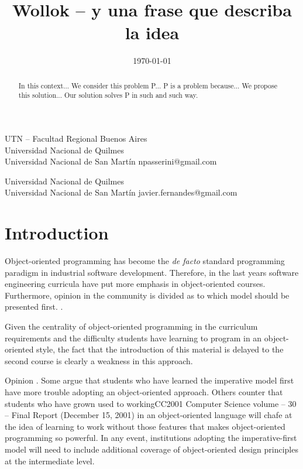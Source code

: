 \documentclass[preprint,10pt]{sigplanconf}
\begin{document}
\title{Wollok -- y una frase que describa la idea}
  {UTN -- Facultad Regional Buenos Aires \\ Universidad Nacional de Quilmes \\ Universidad Nacional de San Martín}
  {npasserini@gmail.com}
  
  {Universidad Nacional de Quilmes \\ Universidad Nacional de San Martín}
  {javier.fernandes@gmail.com}

\date{\today}
\maketitle

\begin{abstract}
In this context...
We consider this problem P...
P is a problem because...
We propose this solution...
Our solution solves P in such and such way.
\end{abstract}


\section{Introduction}
\label{sec:intro}


Object-oriented programming has become the \textit{de facto} standard programming paradigm in industrial software development.
Therefore, in the last years software engineering curricula have put more emphasis in object-oriented courses.
Furthermore, opinion in the community is divided as to which model should be presented first. \cite{cooper_teaching_2003}.



Given the centrality of object-oriented programming in the
curriculum requirements and the difficulty students have learning to program in an
object-oriented style, the fact that the introduction of this material is delayed to the
second course is clearly a weakness in this approach. 

Opinion . Some argue
that students who have learned the imperative model first have more trouble adopting an
object-oriented approach. Others counter that students who have grown used to workingCC2001 Computer Science volume – 30 –
Final Report (December 15, 2001)
in an object-oriented language will chafe at the idea of learning to work without those
features that makes object-oriented programming so powerful.
In any event, institutions adopting the imperative-first model will need to include
additional coverage of object-oriented design principles at the intermediate level. 
\end{document}
